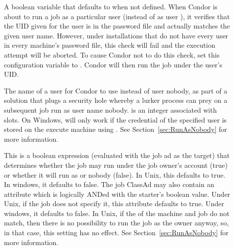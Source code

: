 \begin{description}
\item[] \label{param:SoftUidDomain}
  A boolean variable that defaults to  when not defined.
  When Condor is about to run a job as a particular user 
  (instead of as user ),
  it verifies that the UID given for the user is in the
  password file and actually matches the given user name.
  However, under installations that do not have every user
  in every machine's password file,
  this check will fail and the execution attempt will be aborted.
  To cause Condor not to do
  this check, set this configuration variable to .
  Condor will then run the job under the user's UID.

\item[] \label{param:SlotXUser}
  The name of a user for Condor to use instead of
  user nobody,
  as part of a solution that plugs a security hole whereby
  a lurker process can prey on a subsequent job run as user name nobody. 
   is an integer associated with slots.
  On Windows, 
  will only work if the credential of the specified
  user is stored on the execute machine using .
  See Section~\ref{sec:RunAsNobody} for more information.

\item[]
  \label{param:StarterAllowRunAsOwner}
  This is a boolean expression (evaluated with the job ad as the
  target) that determines whether the job may run under the job owner's
  account (true) or whether it will run as  or
  nobody (false).  In Unix, this defaults to true.  In windows, it
  defaults to false.  The job ClassAd may also contain an attribute
   which is logically ANDed with the starter's
  boolean value.  Under Unix, if the job does not specify it, this
  attribute defaults to true.  Under windows, it defaults to false.
  In Unix, if the  of the machine and job do not
  match, then there is no possibility to run the job as the owner
  anyway, so, in that case, this setting has no effect.  See
  Section~\ref{sec:RunAsNobody} for more information.


\end{description}
